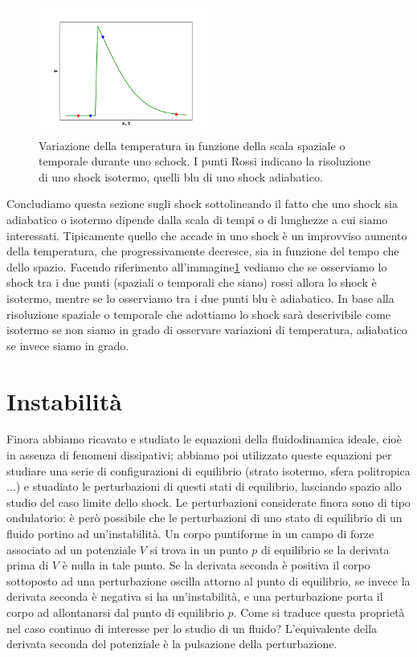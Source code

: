 \begin{figure}[h!]
\begin{center}
\includegraphics[width=0.5\textwidth]{img/Figure_1}
\caption{Variazione della temperatura in funzione della scala spaziale o temporale durante uno schock. I punti Rossi indicano la risoluzione di uno shock isotermo, quelli blu di uno shock adiabatico.} \label{im:Shock}
\end{center}
\end{figure}
Concludiamo questa sezione sugli shock sottolineando il fatto che uno shock sia adiabatico o isotermo dipende dalla scala di tempi o di lunghezze a cui siamo interessati. Tipicamente quello che accade in uno shock è un improvviso aumento della temperatura, che progressivamente decresce, sia in funzione del tempo che dello spazio. Facendo riferimento all'immagine\ref{im:Shock} vediamo che se osserviamo lo shock tra i due punti (spaziali o temporali che siano) rossi allora lo shock è isotermo, mentre se lo osserviamo tra i due punti blu è adiabatico. In base alla risoluzione spaziale o temporale che adottiamo lo shock sarà descrivibile come isotermo se non siamo in grado di osservare variazioni di temperatura, adiabatico se invece siamo in grado.


\section{Instabilità}
Finora abbiamo ricavato e studiato le equazioni della fluidodinamica ideale, cioè in assenza di fenomeni dissipativi; abbiamo poi utilizzato queste equazioni per studiare una serie di configurazioni di equilibrio (strato isotermo, sfera politropica ...) e stuadiato le perturbazioni di questi stati di equilibrio, lasciando spazio allo studio del caso limite dello shock. Le perturbazioni considerate finora sono di tipo ondulatorio: è però possibile che le perturbazioni di uno stato di equilibrio di un fluido portino ad un'instabilità. Un corpo puntiforme in un campo di forze associato ad un potenziale $V$ si trova in un punto $p$ di equilibrio se la derivata prima di $V$ è nulla in tale punto. Se la derivata seconda è positiva il corpo sottoposto ad una perturbazione oscilla attorno al punto di equilibrio, se invece la derivata seconda è negativa si ha un'instabilità, e una perturbazione porta il corpo ad allontanarsi dal punto di equilibrio $p$. Come si traduce questa proprietà nel caso continuo di interesse per lo studio di un fluido? L'equivalente della derivata seconda del potenziale è la pulsazione della perturbazione.

